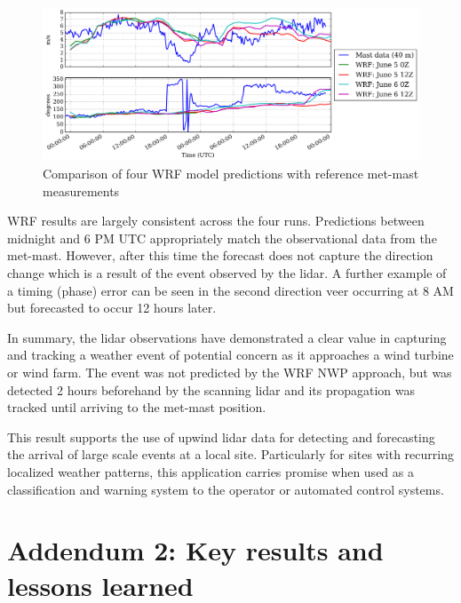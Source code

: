 \begin{figure}[H]
    \centering
        \includegraphics[width=1.0\textwidth]{graphics/results/balcony-addendum/wrf_mast_comparison.png}
    \caption{Comparison of four WRF model predictions with reference met-mast measurements}
    \label{fig:wrf_mast_comparison}
\end{figure}

WRF results are largely consistent across the four runs. Predictions between midnight and 6 PM UTC appropriately match the observational data from the met-mast. However, after this time the forecast does not capture the direction change which is a result of the event observed by the lidar. A further example of a timing (phase) error can be seen in the second direction veer occurring at 8 AM but forecasted to occur 12 hours later.

In summary, the lidar observations have demonstrated a clear value in capturing and tracking a weather event of potential concern as it approaches a wind turbine or wind farm. The event was not predicted by the WRF NWP approach, but was detected 2 hours beforehand by the scanning lidar and its propagation was tracked until arriving to the met-mast position.

This result supports the use of upwind lidar data for detecting and forecasting the arrival of large scale events at a local site. Particularly for sites with recurring localized weather patterns, this application carries promise when used as a classification and warning system to the operator or automated control systems.

\clearpage
\section{Addendum 2: Key results and lessons learned}
\label{sec:balcony_addendum2}
\bigskip

